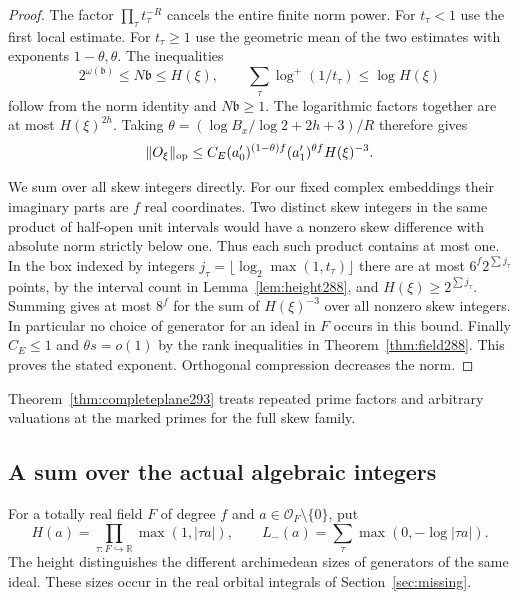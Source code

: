 \documentclass[a4paper,11pt]{article}
\theoremstyle{definition}
\theoremstyle{remark}
\newcommand{\RR}{\mathbb R}\newcommand{\CC}{\mathbb C}\newcommand{\QQ}{\mathbb Q}
\numberwithin{equation}{section}
\begin{document}
\begin{proof}
The factor \(\prod_\tau t_\tau^{-R}\) cancels the entire
finite norm power. For \(t_\tau<1\) use the first local
estimate. For \(t_\tau\ge1\) use the geometric mean of
the two estimates with exponents \(1-\theta,\theta\).
The inequalities
\[
  2^{\omega(\mathfrak b)}\le N\mathfrak b\le H(\xi),
  \qquad\sum_\tau\log^+(1/t_\tau)\le\log H(\xi)
\]
follow from the norm identity and \(N\mathfrak b\ge1\).
The logarithmic factors together are at most \(H(\xi)^{2h}\).
Taking \(\theta=(\log B_x/\log 2+2h+3)/R\) therefore gives
\[
       \|O_\xi\|_{\rm op}
            \le C_E(a'_0)^{(1-\theta)f}(a'_1)^{\theta f}
                          H(\xi)^{-3}.
\]

We sum over all skew integers directly. For our fixed complex
embeddings their imaginary parts are \(f\) real coordinates.
Two distinct skew integers in the same product of half-open
unit intervals would have a nonzero skew difference with
absolute norm strictly below one. Thus each such product
contains at most one. In the box indexed by integers
\(j_\tau=\lfloor\log_2\max(1,t_\tau)\rfloor\) there are at
most \(6^f2^{\sum j_\tau}\) points, by the interval count in
Lemma~\ref{lem:height288}, and \(H(\xi)\ge2^{\sum j_\tau}\).
Summing gives at most \(8^f\) for the sum of \(H(\xi)^{-3}\)
over all nonzero skew integers. In particular no choice of
generator for an ideal in \(F\) occurs in this bound.
Finally \(C_E\le1\) and \(\theta s=o(1)\) by the rank
inequalities in Theorem~\ref{thm:field288}. This proves the
stated exponent. Orthogonal compression decreases the norm.
\end{proof}

Theorem~\ref{thm:completeplane293} treats repeated prime factors and arbitrary valuations at the marked primes for the full skew family.

\subsection{A sum over the actual algebraic integers}\label{nav:III-54}
For a totally real field \(F\) of degree \(f\) and
\(a\in\mathcal O_F\setminus\{0\}\), put
\[
 H(a)=\prod_{\tau:F\hookrightarrow\RR}\max(1,|\tau a|),
 \qquad
 L_-(a)=\sum_\tau\max(0,-\log|\tau a|).
\]
The height distinguishes the different archimedean sizes of
generators of the same ideal. These sizes occur in the real
orbital integrals of Section~\ref{sec:missing}.
\end{document}
